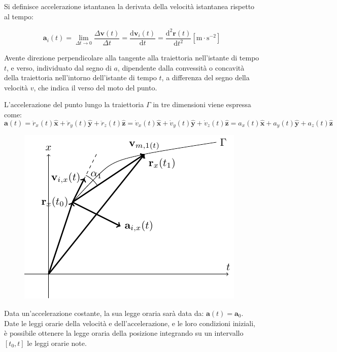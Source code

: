 \documentclass{article}
\newcommand{\vect}[1]{\boldsymbol{\mathbf{#1}}}
\newcommand{\df}{\mathrm{d}}
\numberwithin{equation}{subsection}
\begin{document}
Si definisce accelerazione istantanea la derivata della velocità istantanea rispetto al tempo: 

\begin{equation}
    \vect{a}_i(t) = \lim_{\Delta t \to 0}\displaystyle\frac{\Delta\vect{v}(t)}{\Delta t} = \frac{\df\vect{v}_i(t)}{\df t} = \frac{\df^{2}\vect{r}(t)}{\df t^{2}}\left[\mathrm{m}\cdot\mathrm{s}^{-2}\right]
\end{equation}

Avente direzione perpendicolare alla tangente alla 
traiettoria nell'istante di tempo $t$, e verso, individuato dal segno di $a$, dipendente dalla convessità o concavità della traiettoria
nell'intorno dell'istante di tempo $t$, a differenza del segno della velocità $v$, che indica il verso 
del moto del punto.  


L'accelerazione del punto lungo la traiettoria $\Gamma$ in tre dimensioni viene espressa come:
\begin{equation}
    \vect{a}(t) = \ddot{r}_x(t)\hat{\vect{x}} +\ddot{r}_y(t)\hat{\vect{y}} +\ddot{r}_z(t)\hat{\vect{z}} = \dot{v}_x(t)\hat{\vect{x}} + \dot{v}_y(t)\hat{\vect{y}} + \dot{v}_z(t)\hat{\vect{z}} = a_x(t)\hat{\vect{x}} +a_y(t)\hat{\vect{y}} + a_z(t)\hat{\vect{z}}
\end{equation}

\begin{figure}[H]%
    \centering
    \includegraphics{velocita-accelerazione.pdf}%
\end{figure}

Data un'accelerazione costante, la sua legge oraria sarà data 
da: $\vect{a}(t) = \vect{a}_0$. 
Date le leggi orarie della velocità e dell'accelerazione, e le loro condizioni iniziali, è possibile ottenere la legge 
oraria della posizione integrando su un intervallo $[t_0,t]$ le leggi orarie note. 
\end{document}
